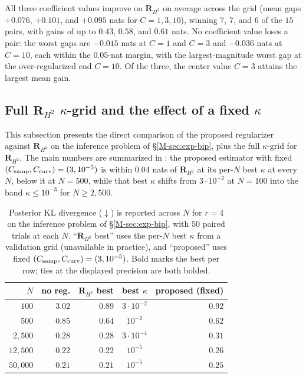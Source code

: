 \documentclass[supplement,review,hidelinks,onefignum,onetabnum]{siamart251216}
\newcommand{\mR}{\bm{R}}
\begin{document}
All three coefficient values improve on $\mR_{H^2}$ on average across the grid (mean gaps $+0.076$, $+0.101$, and $+0.095$ nats for $C = 1, 3, 10$), winning $7$, $7$, and $6$ of the $15$ pairs, with gains of up to $0.43$, $0.58$, and $0.61$ nats. No coefficient value loses a pair: the worst gaps are $-0.015$ nats at $C = 1$ and $C = 3$ and $-0.036$ nats at $C = 10$, each within the $0.05$-nat margin, with the largest-magnitude worst gap at the over-regularized end $C = 10$. Of the three, the center value $C=3$ attains the largest mean gain.

\subsection{\texorpdfstring{Full $\mR_{H^2}$ $\kappa$-grid and the effect of a fixed $\kappa$}{Full RH2 kappa-grid and the effect of a fixed kappa}}
\label{sec:sm2-dw-vs-h}

This subsection presents the direct comparison of the proposed regularizer against $\mR_{H^2}$ on the inference problem of \S\ref{M-sec:exp-bip}, plus the full $\kappa$-grid for $\mR_{H^2}$. The main numbers are summarized in : the proposed estimator with fixed $(C_{\rm samp}, C_{\rm curv}) = (3, 10^{-5})$ is within $0.04$ nats of $\mR_{H^2}$ at its per-$N$ best $\kappa$ at every $N$, below it at $N = 500$, while that best $\kappa$ shifts from $3\cdot10^{-2}$ at $N = 100$ into the band $\kappa \le 10^{-3}$ for $N \ge 2{,}500$.

\begin{table}[h]
\centering\small
\caption{Posterior KL divergence ($\downarrow$) is reported across $N$ for $r=4$ on the inference problem of \S\ref{M-sec:exp-bip}, with $50$ paired trials at each $N$. ``$\mR_{H^2}$ best'' uses the per-$N$ best $\kappa$ from a validation grid (unavailable in practice), and ``proposed'' uses fixed $(C_{\rm samp}, C_{\rm curv}) = (3, 10^{-5})$. Bold marks the best per row; ties at the displayed precision are both bolded.}
\label{tab:stage2-headline}
\begin{tabular}{r|rrcr}
\toprule
$N$ & no reg. & $\mR_{H^2}$ best & best $\kappa$ & proposed (fixed) \\
\midrule
$100$      & $3.02$ & $\mathbf{0.89}$ & $3\!\cdot\!10^{-2}$ & $0.92$\\
$500$      & $0.85$ & $0.64$ & $10^{-2}$ & $\mathbf{0.62}$\\
$2{,}500$  & $\mathbf{0.28}$ & $\mathbf{0.28}$ & $3\!\cdot\!10^{-4}$ & $0.31$\\
$12{,}500$ & $\mathbf{0.22}$ & $\mathbf{0.22}$ & $10^{-5}$ & $0.26$\\
$50{,}000$ & $\mathbf{0.21}$ & $\mathbf{0.21}$ & $10^{-5}$ & $0.25$\\
\bottomrule
\end{tabular}
\end{table}
\end{document}
